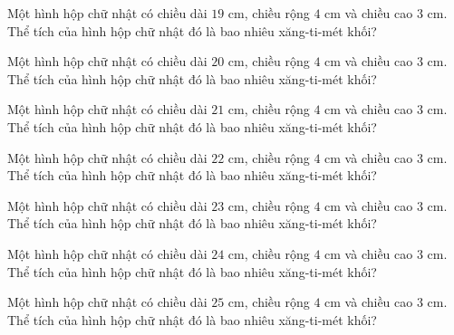 \begin{ex}
  Một hình hộp chữ nhật có chiều dài $19\text{ cm}$, chiều rộng $4\text{ cm}$ và chiều cao $3\text{ cm}$. Thể tích của hình hộp chữ nhật đó là bao nhiêu xăng-ti-mét khối?
\end{ex}

\begin{ex}
  Một hình hộp chữ nhật có chiều dài $20\text{ cm}$, chiều rộng $4\text{ cm}$ và chiều cao $3\text{ cm}$. Thể tích của hình hộp chữ nhật đó là bao nhiêu xăng-ti-mét khối?
\end{ex}

\begin{ex}
  Một hình hộp chữ nhật có chiều dài $21\text{ cm}$, chiều rộng $4\text{ cm}$ và chiều cao $3\text{ cm}$. Thể tích của hình hộp chữ nhật đó là bao nhiêu xăng-ti-mét khối?
\end{ex}

\begin{ex}
  Một hình hộp chữ nhật có chiều dài $22\text{ cm}$, chiều rộng $4\text{ cm}$ và chiều cao $3\text{ cm}$. Thể tích của hình hộp chữ nhật đó là bao nhiêu xăng-ti-mét khối?
\end{ex}

\begin{ex}
  Một hình hộp chữ nhật có chiều dài $23\text{ cm}$, chiều rộng $4\text{ cm}$ và chiều cao $3\text{ cm}$. Thể tích của hình hộp chữ nhật đó là bao nhiêu xăng-ti-mét khối?
\end{ex}

\begin{ex}
  Một hình hộp chữ nhật có chiều dài $24\text{ cm}$, chiều rộng $4\text{ cm}$ và chiều cao $3\text{ cm}$. Thể tích của hình hộp chữ nhật đó là bao nhiêu xăng-ti-mét khối?
\end{ex}

\begin{ex}
  Một hình hộp chữ nhật có chiều dài $25\text{ cm}$, chiều rộng $4\text{ cm}$ và chiều cao $3\text{ cm}$. Thể tích của hình hộp chữ nhật đó là bao nhiêu xăng-ti-mét khối?
\end{ex}

